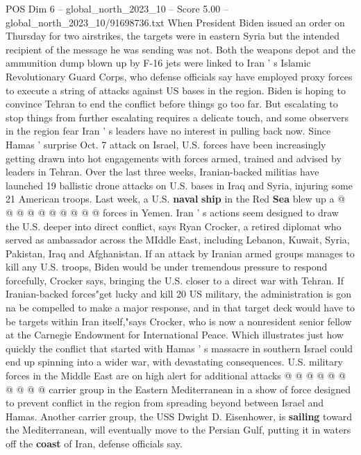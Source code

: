 \begin{textsample}{POS Dim 6 – global\_north\_2023\_10 – Score 5.00 – global\_north\_2023\_10/91698736.txt}  \label{ex:f6_pos_207}
When President Biden issued an order on Thursday for two airstrikes, the targets were in eastern Syria but the intended recipient of the message he was sending was not.
Both the weapons depot and the ammunition dump blown up by F-16 jets were linked to Iran ' s Islamic Revolutionary Guard Corps, who defense officials say have employed proxy forces to execute a string of attacks against US bases in the region.
Biden is hoping to convince Tehran to end the conflict before things go too far.
But escalating to stop things from further escalating requires a delicate touch, and some observers in the region fear Iran ' s leaders have no interest in pulling back now.
Since Hamas ' surprise Oct. 7 attack on Israel, U.S. forces have been increasingly getting drawn into hot engagements with forces armed, trained and advised by leaders in Tehran.
Over the last three weeks, Iranian-backed militias have launched 19 ballistic drone attacks on U.S. bases in Iraq and Syria, injuring some 21 American troops.
Last week, a U.S. \textbf{naval} \textbf{ship} in the Red \textbf{Sea} blew up a @ @ @ @ @ @ @ @ @ @ forces in Yemen.
Iran ' s actions seem designed to draw the U.S. deeper into direct conflict, says Ryan Crocker, a retired diplomat who served as ambassador across the MIddle East, including Lebanon, Kuwait, Syria, Pakistan, Iraq and Afghanistan.
If an attack by Iranian armed groups manages to kill any U.S. troops, Biden would be under tremendous pressure to respond forcefully, Crocker says, bringing the U.S. closer to a direct war with Tehran.
If Iranian-backed forces"get lucky and kill 20 US military, the administration is gon na be compelled to make a major response, and in that target deck would have to be targets within Iran itself,"says Crocker, who is now a nonresident senior fellow at the Carnegie Endowment for International Peace.
Which illustrates just how quickly the conflict that started with Hamas ' s massacre in southern Israel could end up spinning into a wider war, with devastating consequences.
U.S. military forces in the Middle East are on high alert for additional attacks @ @ @ @ @ @ @ @ @ @ carrier group in the Eastern Mediterranean in a show of force designed to prevent conflict in the region from spreading beyond between Israel and Hamas.
Another carrier group, the USS Dwight D.
Eisenhower, is \textbf{sailing} toward the Mediterranean, will eventually move to the Persian Gulf, putting it in waters off the \textbf{coast} of Iran, defense officials say.

\end{textsample}
